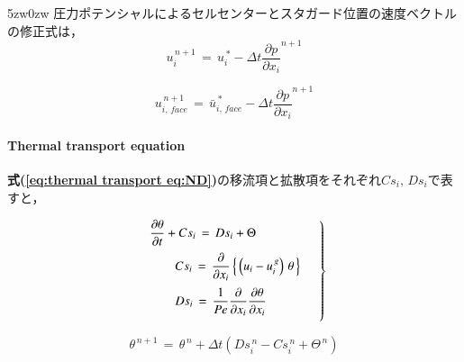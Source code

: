 \begin{indentation}{5zw}{0zw}
\noindent 圧力ポテンシャルによるセルセンターとスタガード位置の速度ベクトルの修正式は，
\begin{equation}
u_i^{\,n+1} \,=\, u_i^{\,*} - \Delta t {\frac{\partial p}{\partial x_i}}^{n+1}
\label{eq:Pressure correction CC}
\end{equation}

\begin{equation}
u_{i,\,face}^{\,n+1} \,=\, \bar{u}_{i,\,face}^{\,*} - \Delta t {\frac{\partial p}{\partial x_i}}^{n+1}
\label{eq:Pressure correction CF}
\end{equation}

\paragraph{Thermal transport equation} $\mbox{}$\\
\textbf{式(\ref{eq:thermal transport eq:ND})}の移流項と拡散項をそれぞれ$Cs_i,\,Ds_i$で表すと，

\begin{equation}
\left.
\begin{array}{l} 
\vspace{2mm}
\displaystyle { \frac{\partial \theta}{\partial t} + Cs_i \,=\, Ds_i + \Theta } \\
\vspace{2mm}
\qquad \displaystyle{ Cs_i \,=\, \frac{\partial}{\partial x_i} \left\{ \, \left( u_i - u_i^{\,g} \right) \, \theta \, \right\} } \\
\vspace{2mm}
\qquad \displaystyle{ Ds_i \,=\, \frac{1}{Pe}\frac{\partial}{\partial x_i} \frac{\partial \theta}{\partial x_i} } \\
\end{array} \quad \right \}
\label{eq:thermal transport eqs}
\end{equation}

\begin{equation}
\theta^{\,n+1} \,=\, \theta^{\,n} + \Delta t \left( Ds_i^{\,n} - Cs_i^{\,n} + \Theta^{\,n} \right)
\label{eq:thermal transport EE}
\end{equation}

\end{indentation}

